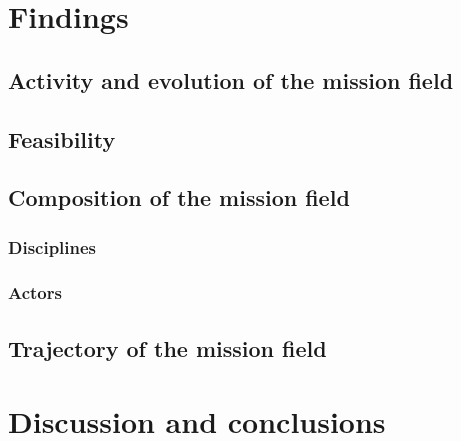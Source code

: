 \documentclass[11pt]{article}
\begin{document}
\section{Findings}
\subsection{Activity and evolution of the mission field}
\subsection{Feasibility}
\subsection{Composition of the mission field}
\subsubsection{Disciplines}
\subsubsection{Actors}
\subsection{Trajectory of the mission field}
\section{Discussion and conclusions}




%
\end{document}
